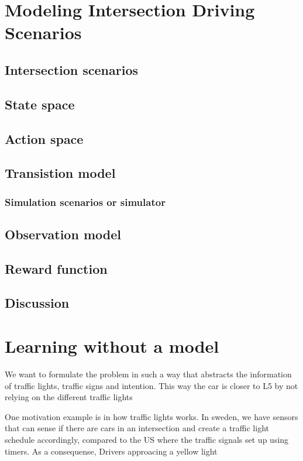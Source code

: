 \chapter{Modeling Intersection Driving Scenarios}
\section{Intersection scenarios}
\section{State space}
\section{Action space}
\section{Transistion model}
\subsection{Simulation scenarios or simulator}
\section{Observation model}
\section{Reward function}
\section{Discussion}




\chapter{Learning without a model}
We want to formulate the problem in such a way that abstracts the information of traffic lights, traffic signs and intention. This way the car is closer to L5 by not relying on the different traffic lights

One motivation example is in how traffic lights works. In sweden, we have sensors that can sense if there are cars in an intersection and create a traffic light schedule accordingly, compared to the US where the traffic signals set up using timers. As a consequense, Drivers approacing a yellow light 


